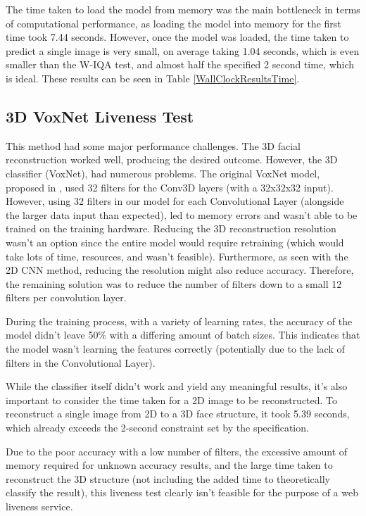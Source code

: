 \documentclass[12pt,a4paper]{article}
\begin{document}
    The time taken to load the model from memory was the main bottleneck in terms of computational performance, as loading the model into memory for the first time took 7.44 seconds. However, once the model was loaded,
    the time taken to predict a single image is very small, on average taking 1.04 seconds, which is even smaller than the W-IQA test, and almost half the specified 2 second time, which is ideal. These results can be seen in Table \ref{WallClockResultsTime}.     

    \subsection{3D VoxNet Liveness Test}
    This method had some major performance challenges. The 3D facial reconstruction worked well, producing the desired outcome. However, the 3D classifier (VoxNet), had numerous problems.
    The original VoxNet model, proposed in \cite{VoxNetModel}, used 32 filters for the Conv3D layers (with a 32x32x32 input). However, using 32 filters in our model for each Convolutional Layer (alongside the larger data input than expected),
    led to memory errors and wasn't able to be trained on the training hardware.  Reducing the 3D reconstruction resolution wasn't an option since the entire model would require retraining (which would take lots of time, resources, and wasn't feasible).
    Furthermore, as seen with the 2D CNN method, reducing the resolution might also reduce accuracy. Therefore, the remaining solution was to reduce the number of filters down to a small 12 filters per convolution layer.

    During the training process, with a variety of learning rates, the accuracy of the model didn't leave 50\% with a differing amount of batch sizes. This indicates that the model wasn't learning the features correctly (potentially due to the lack of filters in the Convolutional Layer).
    
    While the classifier itself didn't work and yield any meaningful results, it's also important to consider the time taken for a 2D image to be reconstructed. 
    To reconstruct a single image from 2D to a 3D face structure, it took 5.39 seconds, which already exceeds the 2-second constraint set by the specification.
   
    Due to the poor accuracy with a low number of filters, the excessive amount of memory required for unknown accuracy results, and the large time taken to reconstruct the 3D structure (not including the added time to theoretically classify the result),
    this liveness test clearly isn't feasible for the purpose of a web liveness service.
    
\end{document}
